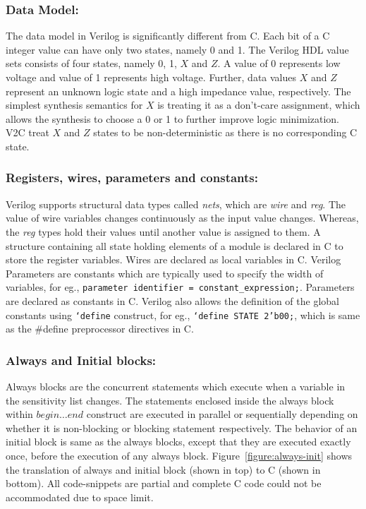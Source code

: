 \subsubsection{Data Model:} The data model in Verilog is significantly 
different from C.  Each bit of a C integer value can have 
only two states, namely 0 and 1.  The Verilog HDL
value sets consists of four states, namely 0, 1, $X$ and $Z$.  A value of 0
represents low voltage and value of 1 represents high voltage.  Further,
data values $X$ and $Z$ represent an unknown logic state and a 
high impedance value, respectively.  The simplest synthesis semantics 
for $X$ is treating it as a don't-care assignment, which allows the 
synthesis to choose a 0 or 1 to further improve logic minimization.
V2C treat $X$ and $Z$ states to be non-deterministic as there is no
corresponding C state. 

\subsubsection{Registers, wires, parameters and constants:} Verilog supports structural 
data types called \emph{nets}, which are \emph{wire}
and \emph{reg}. The value of wire variables changes 
continuously as the input value changes.  Whereas, 
the \emph{reg} types hold their values until another value is 
assigned to them.  A structure containing all state holding
elements of a module is declared in C to store the register
variables. Wires are declared as local variables in C.  
Verilog Parameters are constants which 
are typically used to specify the width of variables,
for eg., \texttt{parameter identifier = constant\_expression;}.
Parameters are declared as constants in C.  
Verilog also allows the definition of the global constants 
using \texttt{`define} construct, for eg., \texttt{`define STATE 2'b00;},
which is same as the \#define preprocessor directives in C.

\subsubsection{Always and Initial blocks:}
Always blocks are the concurrent statements which execute when a 
variable in the sensitivity list changes. The statements enclosed inside the 
always block within $begin \ldots end$ construct are executed in parallel
or sequentially depending on whether it is non-blocking or blocking statement 
respectively.   The behavior of an initial block is same as the always blocks, 
except that they are executed exactly once, before the execution of any 
always block. Figure~\ref{figure:always-init} shows the translation of always
and initial block (shown in top) to C (shown in bottom). All code-snippets are
partial and complete C code could not be accommodated due to space limit.

